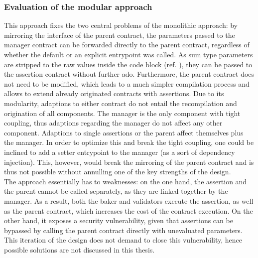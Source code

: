 \subsubsection{Evaluation of the modular approach}
This approach fixes the two central problems of the monolithic approach: by mirroring the interface of the parent contract, the parameters passed to the manager contract can be forwarded directly to the parent contract, regardless of whether the default or an explicit entrypoint was called. As sum type parameters are stripped to the raw values inside the code block (ref. ), they can be passed to the assertion contract without further ado. Furthermore, the parent contract does not need to be modified, which leads to a much simpler compilation process and allows to extend already originated contracts with assertions. Due to its modularity, adaptions to either contract do not entail the recompilation and origination of all components. The manager is the only component with tight coupling, thus adaptions regarding the manager do not affect any other component. Adaptions to single assertions or the parent affect themselves plus the manager. In order to optimize this and break the tight coupling, one could be inclined to add a setter entrypoint to the manager (as a sort of dependency injection). This, however, would break the mirroring of the parent contract and is thus not possible without annulling one of the key strengths of the design.\\
The approach essentially has to weaknesses: on the one hand, the assertion and the parent cannot be called separately, as they are linked together by the manager. As a result, both the baker and validators execute the assertion, as well as the parent contract, which increases the cost of the contract execution. On the other hand, it exposes a security vulnerability, given that assertions can be bypassed by calling the parent contract directly with unevaluated parameters. This iteration of the design 
does not demand to close this vulnerability, hence possible solutions are not discussed in this thesis.

